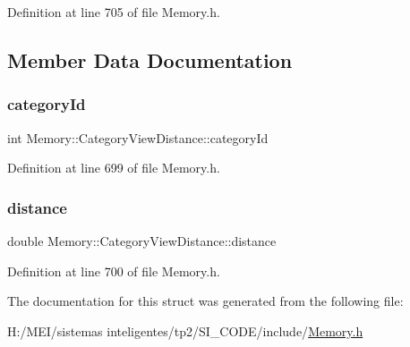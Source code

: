 Definition at line 705 of file Memory.\+h.



\subsection{Member Data Documentation}
\mbox{\label{struct_memory_1_1_category_view_distance_aaa0114f6bc41b1df4cc5fb5f4eb11017}} 
\subsubsection{\texorpdfstring{category\+Id}{categoryId}}
{\footnotesize\ttfamily int Memory\+::\+Category\+View\+Distance\+::category\+Id}



Definition at line 699 of file Memory.\+h.

\mbox{\label{struct_memory_1_1_category_view_distance_aab4f1397e33f96a80d6e5e77cc66593c}} 
\subsubsection{\texorpdfstring{distance}{distance}}
{\footnotesize\ttfamily double Memory\+::\+Category\+View\+Distance\+::distance}



Definition at line 700 of file Memory.\+h.



The documentation for this struct was generated from the following file\+:\begin{DoxyCompactItemize}
\item 
H\+:/\+M\+E\+I/sistemas inteligentes/tp2/\+S\+I\+\_\+\+C\+O\+D\+E/include/\hyperlink{_memory_8h}{Memory.\+h}\end{DoxyCompactItemize}
